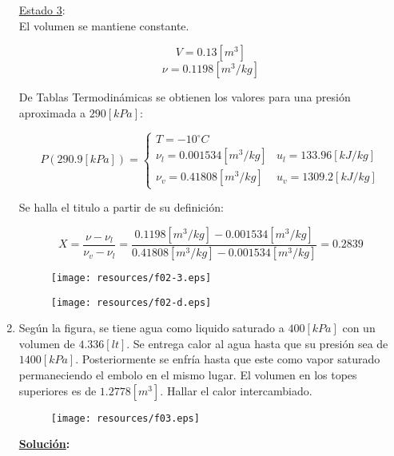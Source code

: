 \documentclass[letter,11pt]{article}
\begin{document}
\begin{enumerate}
\underline{Estado 3}: \\
El volumen se mantiene constante.

\begin{equation*}
    V = 0.13[m^3]
\end{equation*}
\begin{equation*}
    \nu = 0.1198[m^3/kg]
\end{equation*}

De Tablas Termodinámicas se obtienen los valores para una presión aproximada a
$290[kPa]$:

\begin{equation*}
    P(290.9[kPa]) = \begin{cases}
        T = -10^\circ C \\
        \nu_l = 0.001534[m^3/kg] & u_l = 133.96[kJ/kg] \\
        \nu_v = 0.41808[m^3/kg]  & u_v = 1309.2[kJ/kg]
    \end{cases}
\end{equation*}

Se halla el titulo a partir de su definición:

\begin{equation*}
    X = \frac{\nu-\nu_l}{\nu_v-\nu_l}
      = \frac{0.1198[m^3/kg] - 0.001534[m^3/kg]}
      {0.41808[m^3/kg] - 0.001534[m^3/kg]}
      = 0.2839
\end{equation*}

\begin{figure}[H]
\centering
\texttt{[image: resources/f02-3.eps]}
\end{figure}

\begin{figure}[H]
\centering
\texttt{[image: resources/f02-d.eps]}
\end{figure}
\newpage

\item Según la figura, se tiene agua como liquido saturado a $400[kPa]$ con un
volumen de $4.336[lt]$. Se entrega calor al agua hasta que su presión sea de
$1400[kPa]$. Posteriormente se enfría hasta que este como vapor saturado
permaneciendo el embolo en el mismo lugar. El volumen en los topes superiores es
de $1.2778[m^3]$. Hallar el calor intercambiado.

\begin{figure}[H]
\centering
\texttt{[image: resources/f03.eps]}
\end{figure}

\textbf{\underline{Solución}:} \\


\end{enumerate}
\end{document}
